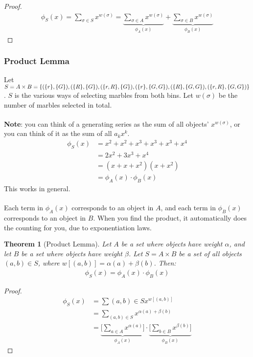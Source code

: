 \documentclass[]{article}
\newtheorem*{theorem}{Theorem}
\theoremstyle{definition}
\newcommand{\lecture}[1]{\marginpar{{\footnotesize $\leftarrow$ \underline{#1}}}}
\DeclarePairedDelimiter{\set}{\lbrace}{\rbrace}
\begin{document}
				\begin{proof}
					\begin{align*}
						\phi_S(x) = \sum_{\sigma \in S} x^{w(\sigma)} = \underbrace{\sum_{\sigma \in A} x^{w(\sigma)}}_{\phi_A(x)} + \underbrace{\sum_{\sigma \in B} x^{w(\sigma)}}_{\phi_B(x)}
					\end{align*}
				\end{proof}
			\subsubsection{Product Lemma} \lecture{January 18, 2013}
				Let $S = A \times B = \set{(\set{r}, \set{G}), (\set{R}, \set{G}), (\set{r, R}, \set{G}), (\set{r}, \set{G, G}), (\set{R}, \set{G, G}), (\set{r, R}, \set{G, G}) }$. $S$ is the various ways of selecting marbles from both bins. Let $w(\sigma)$ be the number of marbles selected in total.
				\\ \\
				\textbf{Note}: you can think of a generating series as the sum of all objects' $x^{w(\sigma)}$, or you can think of it as the sum of all $a_k x^k$.
				\begin{align*}
					\phi_S(x) &= x^2 + x^2 + x^3 + x^3 + x^3 + x^4 \\
					&= 2x^2 + 3x^3 + x^4 \\
					&= (x + x + x^2)(x + x^2) \\
					&= \phi_A(x) \cdot \phi_B(x)
				\end{align*}
				This works in general.
				\\ \\
				Each term in $\phi_A(x)$ corresponds to an object in $A$, and each term in $\phi_B(x)$ corresponds to an object in $B$. When you find the product, it automatically does the counting for you, due to exponentiation laws.
				\begin{theorem}[Product Lemma]
					Let $A$ be a set where objects have weight $\alpha$, and let $B$ be a set where objects have weight $\beta$. Let $S = A \times B$ be a set of all objects $(a, b) \in S$, where $w[(a, b)] = \alpha(a) + \beta(b)$. Then:
					\begin{align*}
						\phi_S(x) = \phi_A(x) \cdot \phi_B(x)
					\end{align*}
				\end{theorem}

				\begin{proof}
					\begin{align*}
						\phi_S(x) &= \sum{(a, b) \in S} x^{w[(a, b)]} \\
						&= \sum_{(a, b) \in S} x^{\alpha(a) + \beta(b)} \\
						&= \underbrace{\bigg[ \sum_{a \in A} x^{\alpha(a)} \bigg]}_{\phi_A(x)} \cdot \underbrace{\bigg[ \sum_{b \in B} x^{\beta(b)} \bigg]}_{\phi_B(x)}
					\end{align*}
				\end{proof}
			
\end{document}
